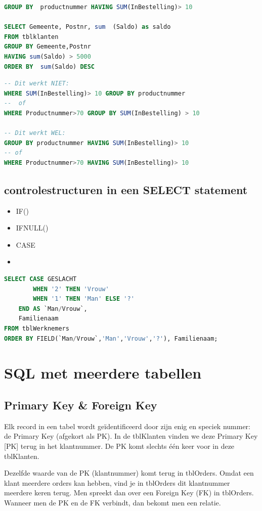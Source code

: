 \documentclass{article}
\begin{document}
\begin{lstlisting}[language=SQL]
GROUP BY  productnummer HAVING SUM(InBestelling)> 10

SELECT Gemeente, Postnr, sum  (Saldo) as saldo  
FROM tblklanten 
GROUP BY Gemeente,Postnr 
HAVING sum(Saldo) > 5000
ORDER BY  sum(Saldo) DESC
\end{lstlisting}

\begin{lstlisting}[language=SQL]
-- Dit werkt NIET:
WHERE SUM(InBestelling)> 10 GROUP BY productnummer
--  of
WHERE Productnummer>70 GROUP BY SUM(InBestelling) > 10

-- Dit werkt WEL:
GROUP BY productnummer HAVING SUM(InBestelling)> 10
-- of 
WHERE Productnummer>70 HAVING SUM(InBestelling)> 10
\end{lstlisting}

\subsection{controlestructuren in een SELECT statement}
\begin{itemize}
    \item IF()
    \item IFNULL()
    \item CASE
    \item 
\end{itemize}

\begin{lstlisting}[language=SQL]
SELECT CASE GESLACHT 
        WHEN '2' THEN 'Vrouw' 
        WHEN '1' THEN 'Man' ELSE '?' 
    END AS `Man/Vrouw`, 
    Familienaam 
FROM tblWerknemers
ORDER BY FIELD(`Man/Vrouw`,'Man','Vrouw','?'), Familienaam;
\end{lstlisting}

\section{SQL met meerdere tabellen}
\subsection{Primary Key \& Foreign Key}
Elk record in een tabel wordt geïdentificeerd door zijn enig en speciek nummer: de Primary Key (afgekort als PK). In de tblKlanten vinden we deze Primary Key [PK] terug in het klantnummer. 
De PK komt slechts één keer voor in deze tblKlanten.

Dezelfde waarde van de PK (klantnummer) komt terug in tblOrders. Omdat een klant meerdere orders kan hebben, vind je in tblOrders dit klantnummer meerdere keren terug.
Men spreekt dan over een Foreign Key (FK) in tblOrders. Wanneer men de PK en de FK verbindt, dan bekomt men een relatie.
\end{document}

